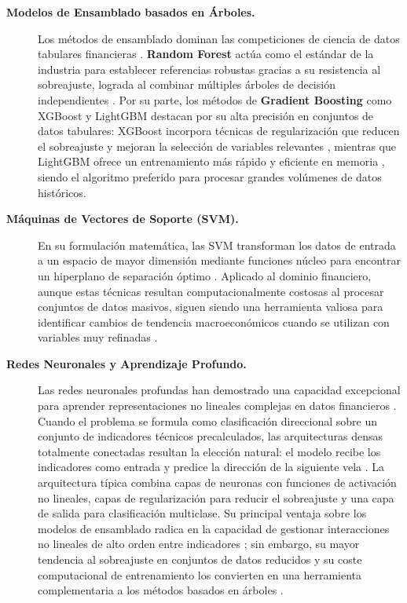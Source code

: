 \begin{description}
    \item[\normalfont\textbf{Modelos de Ensamblado basados en Árboles.}] Los métodos de ensamblado dominan las competiciones de ciencia de datos tabulares financieras \parencite{lopez_de_prado_advances_2018}. \textbf{Random Forest} actúa como el estándar de la industria para establecer referencias robustas gracias a su resistencia al sobreajuste, lograda al combinar múltiples árboles de decisión independientes \parencite{breiman_random_2001}. Por su parte, los métodos de \textbf{Gradient Boosting} como XGBoost \parencite{chen_xgboost_2016} y LightGBM \parencite{ke_lightgbm_2017} destacan por su alta precisión en conjuntos de datos tabulares: XGBoost incorpora técnicas de regularización que reducen el sobreajuste y mejoran la selección de variables relevantes \parencite{chen_xgboost_2016}, mientras que LightGBM ofrece un entrenamiento más rápido y eficiente en memoria \parencite{ke_lightgbm_2017}, siendo el algoritmo preferido para procesar grandes volúmenes de datos históricos.

    \item[\normalfont\textbf{Máquinas de Vectores de Soporte (SVM).}] En su formulación matemática, las SVM transforman los datos de entrada a un espacio de mayor dimensión mediante funciones núcleo para encontrar un hiperplano de separación óptimo \parencite{cortes_support-vector_1995}. Aplicado al dominio financiero, aunque estas técnicas resultan computacionalmente costosas al procesar conjuntos de datos masivos, siguen siendo una herramienta valiosa para identificar cambios de tendencia macroeconómicos cuando se utilizan con variables muy refinadas \parencite{treleaven_algorithmic_2013,pedregosa_scikit_2011}.

    \item[\normalfont\textbf{Redes Neuronales y Aprendizaje Profundo.}] Las redes neuronales profundas han demostrado una capacidad excepcional para aprender representaciones no lineales complejas en datos financieros \parencite{goodfellow_deep_2016}. Cuando el problema se formula como clasificación direccional sobre un conjunto de indicadores técnicos precalculados, las arquitecturas densas totalmente conectadas resultan la elección natural: el modelo recibe los indicadores como entrada y predice la dirección de la siguiente vela \parencite{goodfellow_deep_2016}. La arquitectura típica combina capas de neuronas con funciones de activación no lineales, capas de regularización para reducir el sobreajuste y una capa de salida para clasificación multiclase. Su principal ventaja sobre los modelos de ensamblado radica en la capacidad de gestionar interacciones no lineales de alto orden entre indicadores \parencite{goodfellow_deep_2016}; sin embargo, su mayor tendencia al sobreajuste en conjuntos de datos reducidos y su coste computacional de entrenamiento los convierten en una herramienta complementaria a los métodos basados en árboles \parencite{lopez_de_prado_advances_2018}.
\end{description}

